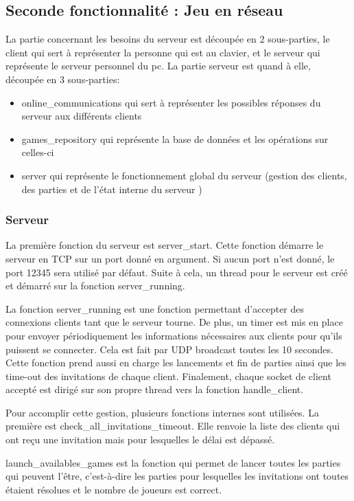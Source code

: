 \documentclass[11pt]{article}
\begin{document}
\subsection{Seconde fonctionnalité : Jeu en réseau}

La partie concernant les besoins du serveur est découpée en 2 sous-parties, le client qui sert à représenter la personne qui est au clavier, et le serveur qui représente le serveur personnel du pc. La partie serveur est quand à elle, découpée en 3 sous-parties:
\begin{itemize}
  \item [$\bullet$] online\_communications qui sert à représenter les possibles réponses du serveur aux différents clients
  \item [$\bullet$] games\_repository qui représente la base de données et les opérations sur celles-ci
  \item [$\bullet$] server qui représente le fonctionnement global du serveur (gestion des clients, des parties et de l’état interne du serveur )
\end{itemize}

\subsubsection{Serveur}
La première fonction du serveur est server\_start. Cette fonction démarre le serveur en TCP sur un port donné en argument. Si aucun port n’est donné, le port 12345 sera utilisé par défaut. 
Suite à cela, un thread pour le serveur est créé et démarré sur la fonction server\_running.

La fonction server\_running est une fonction permettant d’accepter des connexions clients tant que le serveur tourne. 
De plus, un timer est mis en place pour envoyer périodiquement les informations nécessaires aux clients pour qu’ils puissent se connecter. 
Cela est fait par UDP broadcast toutes les 10 secondes. Cette fonction prend aussi en charge les lancements et fin de parties ainsi que les time-out des invitations de chaque client. 
Finalement, chaque socket de client accepté est dirigé sur son propre thread vers la fonction handle\_client.

Pour accomplir cette gestion, plusieurs fonctions internes sont utilisées. 
La première est check\_all\_invitations\_timeout. Elle renvoie la liste des clients qui ont reçu une invitation mais pour lesquelles le délai est dépassé.

launch\_availables\_games est la fonction qui permet de lancer toutes les parties qui peuvent l’être, c'est-à-dire les parties pour lesquelles les invitations ont toutes étaient résolues et le nombre de joueurs est correct.
\end{document}
